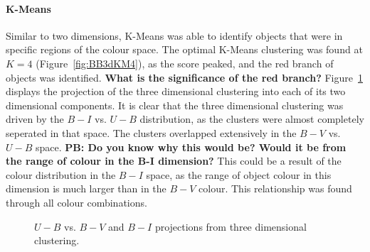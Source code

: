 \paragraph{K-Means}
Similar to two dimensions, K-Means was able to identify objects that were in specific regions of the colour space.
The optimal K-Means clustering was found at $K=4$ (Figure~\ref{fig:BB3dKM4}), as the score peaked, and the red branch of objects was identified. \textbf{What is the significance of the red branch?}
Figure~\ref{fig:BB3dKMproj} displays the projection of the three dimensional clustering into each of its two dimensional components. 
It is clear that the three dimensional clustering was driven by the $B - I$ vs. $U - B$ distribution, as the clusters were almost completely seperated in that space.
The clusters overlapped extensively in the $B - V$ vs. $U - B$ space. \textbf{PB: Do you know why this would be? Would it be from the range of colour in the B-I dimension?}
This could be a result of the colour distribution in the $B - I$ space, as the range of object colour in this dimension is much larger than in the $B - V$ colour.
This relationship was found through all colour combinations.

\begin{figure}
\centering
{}
\hfill
{}
\caption{$U - B$ vs. $B - V$ and $B - I$ projections from three dimensional clustering.}
\label{fig:BB3dKMproj}
\end{figure}

